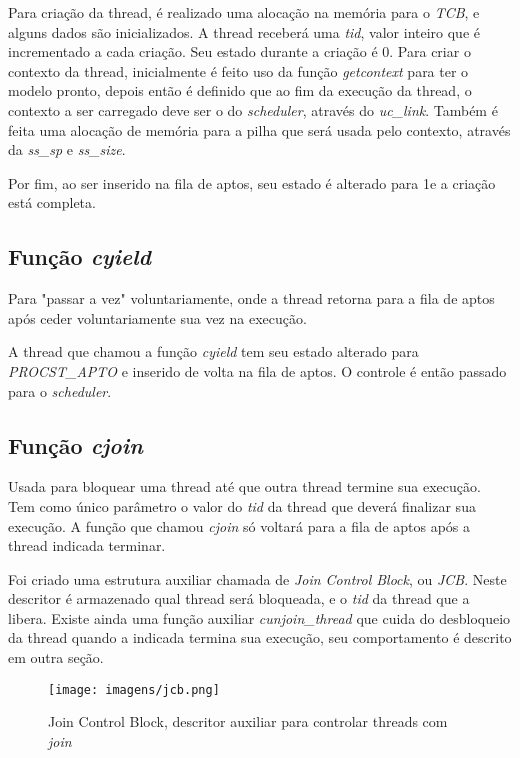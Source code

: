 \documentclass{article}
\begin{document}
Para criação da thread, é realizado uma alocação na memória para o \textit{TCB}, e alguns dados são inicializados. A thread receberá uma \textit{tid}, valor inteiro que é incrementado a cada criação. Seu estado durante a criação é 0\footnotemark. Para criar o contexto da thread, inicialmente é feito uso da função \textit{getcontext} para ter o modelo pronto, depois então é definido que ao fim da execução da thread, o contexto a ser carregado deve ser o do \textit{scheduler}, através do \textit{uc\_link}. Também é feita uma alocação de memória para a pilha que será usada pelo contexto, através da \textit{ss\_sp} e \textit{ss\_size}.

Por fim,  ao ser inserido na fila de aptos, seu estado é alterado para 1\footnotemark e a criação está completa.

\subsection{Função \textit{cyield}}
Para "passar a vez" voluntariamente, onde a thread retorna para a fila de aptos após ceder voluntariamente sua vez na execução.

A thread que chamou a função \textit{cyield} tem seu estado alterado para \textit{PROCST\_APTO} e inserido de volta na fila de aptos. O controle é então passado para o \textit{scheduler}.

\subsection{Função \textit{cjoin}}
Usada para bloquear uma thread até que outra thread termine sua execução. Tem como único parâmetro o valor do \textit{tid} da thread que deverá finalizar sua execução.
A função que chamou \textit{cjoin} só voltará para a fila de aptos após a thread indicada terminar.

Foi criado uma estrutura auxiliar chamada de \textit{Join Control Block}, ou \textit{JCB}. Neste descritor é armazenado qual thread será bloqueada, e o \textit{tid} da thread que a libera. Existe ainda uma função auxiliar \textit{cunjoin\_thread} que cuida do desbloqueio da thread quando a indicada termina sua execução, seu comportamento é descrito em outra seção.

\begin{figure}[ht]
    \centering
    \texttt{[image: imagens/jcb.png]}
    \caption{Join Control Block, descritor auxiliar para controlar threads com \textit{join}}
    \label{fig:sym4}
\end{figure}
\end{document}
